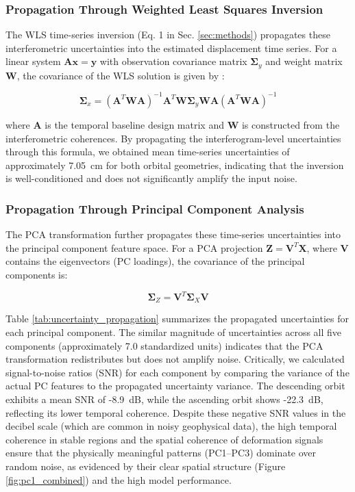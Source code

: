 \subsubsection{Propagation Through Weighted Least Squares Inversion}

The WLS time-series inversion (Eq. 1 in Sec. \ref{sec:methods}) propagates these interferometric uncertainties into the estimated displacement time series. For a linear system $\mathbf{A}\mathbf{x} = \mathbf{y}$ with observation covariance matrix $\boldsymbol{\Sigma}_y$ and weight matrix $\mathbf{W}$, the covariance of the WLS solution is given by \citep{Manunta2010}:

\begin{equation}
\boldsymbol{\Sigma}_x = (\mathbf{A}^T \mathbf{W} \mathbf{A})^{-1} \mathbf{A}^T \mathbf{W} \boldsymbol{\Sigma}_y \mathbf{W} \mathbf{A} (\mathbf{A}^T \mathbf{W} \mathbf{A})^{-1}
\end{equation}

\noindent where $\mathbf{A}$ is the temporal baseline design matrix and $\mathbf{W}$ is constructed from the interferometric coherences. By propagating the interferogram-level uncertainties through this formula, we obtained mean time-series uncertainties of approximately 7.05~cm for both orbital geometries, indicating that the inversion is well-conditioned and does not significantly amplify the input noise.

\subsubsection{Propagation Through Principal Component Analysis}

The PCA transformation further propagates these time-series uncertainties into the principal component feature space. For a PCA projection $\mathbf{Z} = \mathbf{V}^T \mathbf{X}$, where $\mathbf{V}$ contains the eigenvectors (PC loadings), the covariance of the principal components is:

\begin{equation}
\boldsymbol{\Sigma}_Z = \mathbf{V}^T \boldsymbol{\Sigma}_X \mathbf{V}
\end{equation}

Table \ref{tab:uncertainty_propagation} summarizes the propagated uncertainties for each principal component. The similar magnitude of uncertainties across all five components (approximately 7.0 standardized units) indicates that the PCA transformation redistributes but does not amplify noise. Critically, we calculated signal-to-noise ratios (SNR) for each component by comparing the variance of the actual PC features to the propagated uncertainty variance. The descending orbit exhibits a mean SNR of -8.9~dB, while the ascending orbit shows -22.3~dB, reflecting its lower temporal coherence. Despite these negative SNR values in the decibel scale (which are common in noisy geophysical data), the high temporal coherence in stable regions and the spatial coherence of deformation signals ensure that the physically meaningful patterns (PC1–PC3) dominate over random noise, as evidenced by their clear spatial structure (Figure \ref{fig:pc1_combined}) and the high model performance.

